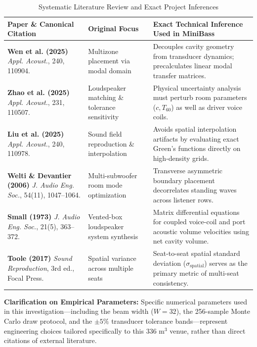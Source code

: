 \documentclass[11pt,a4paper,titlepage]{article}
\begin{document}
\begin{table}[h!]
\centering
\small
\renewcommand{\arraystretch}{1.2}
\caption{Systematic Literature Review and Exact Project Inferences}
\label{tab:lit_review}
\begin{tabularx}{\textwidth}{|p{4.5cm}|p{3.2cm}|X|}
\hline
\textbf{Paper \& Canonical Citation} & \textbf{Original Focus} & \textbf{Exact Technical Inference Used in MiniBass} \\ \hline
\textbf{Wen et al. (2025)} \newline \textit{Appl. Acoust.}, 240, 110904. & Multizone placement via modal domain & Decouples cavity geometry from transducer dynamics; precalculates linear modal transfer matrices. \\ \hline
\textbf{Zhao et al. (2025)} \newline \textit{Appl. Acoust.}, 231, 110507. & Loudspeaker matching \& tolerance sensitivity & Physical uncertainty analysis must perturb room parameters ($c, T_{60}$) as well as driver voice coils. \\ \hline
\textbf{Liu et al. (2025)} \newline \textit{Appl. Acoust.}, 240, 110978. & Sound field reproduction \& interpolation & Avoids spatial interpolation artifacts by evaluating exact Green's functions directly on high-density grids. \\ \hline
\textbf{Welti \& Devantier (2006)} \newline \textit{J. Audio Eng. Soc.}, 54(11), 1047--1064. & Multi-subwoofer room mode optimization & Transverse asymmetric boundary placement decorrelates standing waves across listener rows. \\ \hline
\textbf{Small (1973)} \newline \textit{J. Audio Eng. Soc.}, 21(5), 363--372. & Vented-box loudspeaker system synthesis & Matrix differential equations for coupled voice-coil and port acoustic volume velocities using net cavity volume. \\ \hline
\textbf{Toole (2017)} \newline \textit{Sound Reproduction}, 3rd ed., Focal Press. & Spatial variance across multiple seats & Seat-to-seat spatial standard deviation ($\sigma_{\text{spatial}}$) serves as the primary metric of multi-seat consistency. \\ \hline
\end{tabularx}
\end{table}

\noindent \textbf{Clarification on Empirical Parameters:}
Specific numerical parameters used in this investigation—including the beam width ($W = 32$), the 256-sample Monte Carlo draw protocol, and the $\pm 5\%$ transducer tolerance bands—represent engineering choices tailored specifically to this $336\text{ m}^3$ venue, rather than direct citations of external literature.
\end{document}
